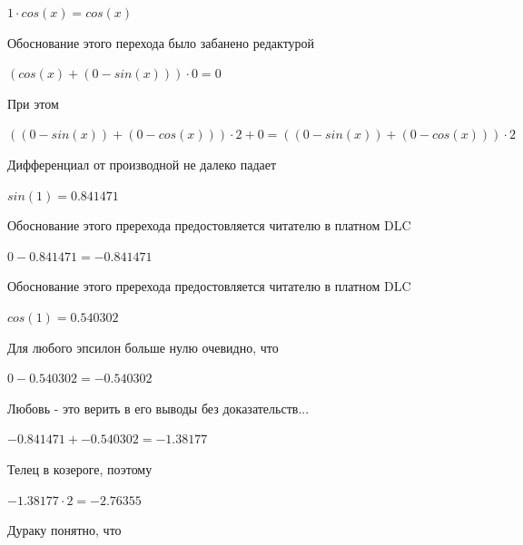 \documentclass[12pt,a4paper,fleqn]{article}
\begin{document}
\begin{center}
$1 \cdot cos(x) = cos(x)$\end{center}
Обоснование этого перехода было забанено редактурой

\begin{center}
$(cos(x)+(0-sin(x))) \cdot 0 = 0$\end{center}
При этом

\begin{center}
$((0-sin(x))+(0-cos(x))) \cdot 2+0 = ((0-sin(x))+(0-cos(x))) \cdot 2$\end{center}
Дифференциал от производной не далеко падает\cite{link2}

\begin{center}
\end{center}
\begin{center}$sin(1) = 0.841471$\end{center}
Обоснование этого пререхода предостовляется читателю в платном DLC

\begin{center}
\end{center}
\begin{center}$0-0.841471 = -0.841471$\end{center}
Обоснование этого пререхода предостовляется читателю в платном DLC

\begin{center}
\end{center}
\begin{center}$cos(1) = 0.540302$\end{center}
Для любого эпсилон больше нулю очевидно, что

\begin{center}
\end{center}
\begin{center}$0-0.540302 = -0.540302$\end{center}
Любовь - это верить в его выводы без доказательств...

\begin{center}
\end{center}
\begin{center}$-0.841471+-0.540302 = -1.38177$\end{center}
Телец в козероге, поэтому

\begin{center}
\end{center}
\begin{center}$-1.38177 \cdot 2 = -2.76355$\end{center}
Дураку понятно, что
\end{document}
